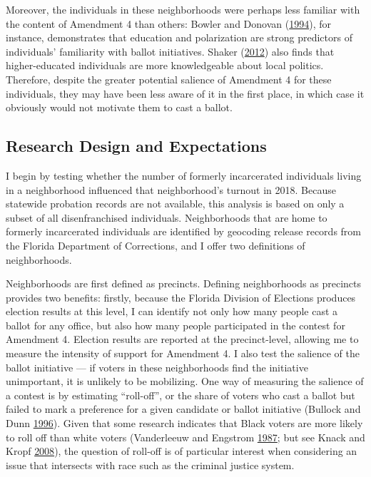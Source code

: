 \documentclass[
  12pt,
]{article}
\begin{document}
Moreover, the individuals in these neighborhoods were perhaps less familiar with the content of Amendment 4 than others: Bowler and Donovan (\protect\hyperlink{ref-Bowler1994}{1994}), for instance, demonstrates that education and polarization are strong predictors of individuals' familiarity with ballot initiatives. Shaker (\protect\hyperlink{ref-Shaker2012}{2012}) also finds that higher-educated individuals are more knowledgeable about local politics. Therefore, despite the greater potential salience of Amendment 4 for these individuals, they may have been less aware of it in the first place, in which case it obviously would not motivate them to cast a ballot.

\hypertarget{research-design-and-expectations}{%
\subsection*{Research Design and Expectations}\label{research-design-and-expectations}}

I begin by testing whether the number of formerly incarcerated individuals living in a neighborhood influenced that neighborhood's turnout in 2018. Because statewide probation records are not available, this analysis is based on only a subset of all disenfranchised individuals. Neighborhoods that are home to formerly incarcerated individuals are identified by geocoding release records from the Florida Department of Corrections, and I offer two definitions of neighborhoods.

Neighborhoods are first defined as precincts. Defining neighborhoods as precincts provides two benefits: firstly, because the Florida Division of Elections produces election results at this level, I can identify not only how many people cast a ballot for any office, but also how many people participated in the contest for Amendment 4. Election results are reported at the precinct-level, allowing me to measure the intensity of support for Amendment 4. I also test the salience of the ballot initiative --- if voters in these neighborhoods find the initiative unimportant, it is unlikely to be mobilizing. One way of measuring the salience of a contest is by estimating ``roll-off'', or the share of voters who cast a ballot but failed to mark a preference for a given candidate or ballot initiative (Bullock and Dunn \protect\hyperlink{ref-Bullock1996}{1996}). Given that some research indicates that Black voters are more likely to roll off than white voters (Vanderleeuw and Engstrom \protect\hyperlink{ref-Vanderleeuw1987}{1987}; but see Knack and Kropf \protect\hyperlink{ref-Knack2008}{2008}), the question of roll-off is of particular interest when considering an issue that intersects with race such as the criminal justice system.
\end{document}

